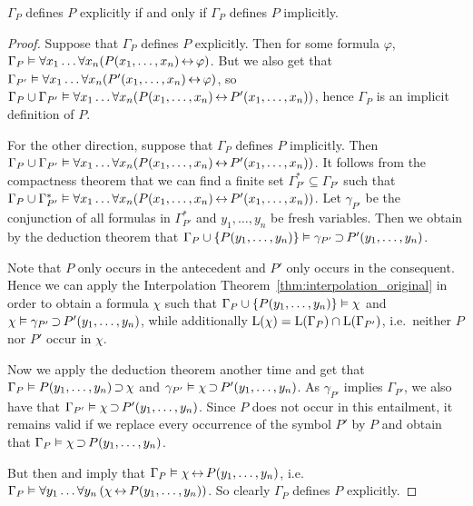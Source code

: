 \begin{thm}
	$\Gamma_P$ defines $P$ explicitly if and only if $\Gamma_P$ defines $P$ implicitly.
\end{thm}
\begin{proof}
	Suppose that $\Gamma_P$ defines $P$ explicitly. 
	Then for some formula $\varphi$,
	$\Gamma_P\vDash \forall x_1\dots \forall x_n (  P(x_1, \dots, x_n) \operatorname{\leftrightarrow} \varphi)$.
	But we also get that
	$\Gamma_{P'}\vDash \forall x_1\dots \forall x_n (  P'(x_1, \dots, x_n) \operatorname{\leftrightarrow} \varphi)$, so
	$\Gamma_{P} \cup \Gamma_{P'} \vDash \forall x_1\dots \forall x_n (P(x_1, \dots, x_n) \operatorname{\leftrightarrow} P'(x_1, \dots, x_n))$, hence $\Gamma_P$ is an implicit definition of $P$.

	For the other direction, suppose that $\Gamma_P$ defines $P$ implicitly. 
	Then
	$\Gamma_P \cup \Gamma_{P'} \vDash \forall x_1\dots \forall x_n (  P(x_1, \dots, x_n) \operatorname{\leftrightarrow} P'(x_1, \dots, x_n))$.
	It follows from the compactness theorem that
	we can find a finite set $\Gamma^*_{P'} \subseteq \Gamma_{P'}$ such that  
	$\Gamma_P \cup \Gamma^*_{P'} \vDash \forall x_1\dots \forall x_n (  P(x_1, \dots, x_n) \operatorname{\leftrightarrow} P'(x_1, \dots, x_n))$.
	Let $\gamma_{P'}$ be the conjunction of all formulas in $\Gamma^*_{P'}$ and  $y_1, \dots, y_n$ be fresh variables.
	Then we obtain by the deduction theorem that  
	$\Gamma_P \cup \{P(y_1, \dots, y_n)\} \vDash \gamma_{P'} \operatorname{\supset}  P'(y_1, \dots, y_n)$.

	Note that $P$ only occurs in the antecedent and $P'$ only occurs in the consequent.
	Hence we can apply the Interpolation Theorem~\ref{thm:interpolation_original} in order to obtain a formula $\chi$
	such that
	$\Gamma_P \cup \{P(y_1, \dots, y_n)\} \vDash \chi$ and
	$\chi \vDash \gamma_{P'} \operatorname{\supset}  P'(y_1, \dots, y_n)$,
	while additionally $\operatorname{L}(\chi) = \operatorname{L}(\Gamma_P) \cap \operatorname{L}(\Gamma_{P'})$, i.e.\ neither $P$ nor $P'$ occur in $\chi$.

	Now we apply the deduction theorem another time and get that
	\markA{} $\Gamma_P \vDash P(y_1, \dots, y_n) \operatorname{\supset} \chi$ and
	$\gamma_{P'} \vDash \chi \operatorname{\supset}  P'(y_1, \dots, y_n)$.
	As $\gamma_{P'}$ implies $\Gamma_{P'}$, we also have that
	$\Gamma_{P'} \vDash \chi \operatorname{\supset}  P'(y_1, \dots, y_n)$.
	Since $P$ does not occur in this entailment, it remains valid if we replace every occurrence of the symbol $P'$ by $P$
	and obtain that
	\markB{} $\Gamma_{P} \vDash \chi \operatorname{\supset}  P(y_1, \dots, y_n)$.

	But then \markA{} and \markB{} imply that 
	\markB{} $\Gamma_{P} \vDash \chi \operatorname{\leftrightarrow}  P(y_1, \dots, y_n)$, i.e.{}
	\markB{} $\Gamma_{P} \vDash \forall y_1\dots\forall y_n \left( \chi \operatorname{\leftrightarrow}  P(y_1, \dots, y_n)\right)$.
	So clearly $\Gamma_P$ defines $P$ explicitly.
\end{proof}



